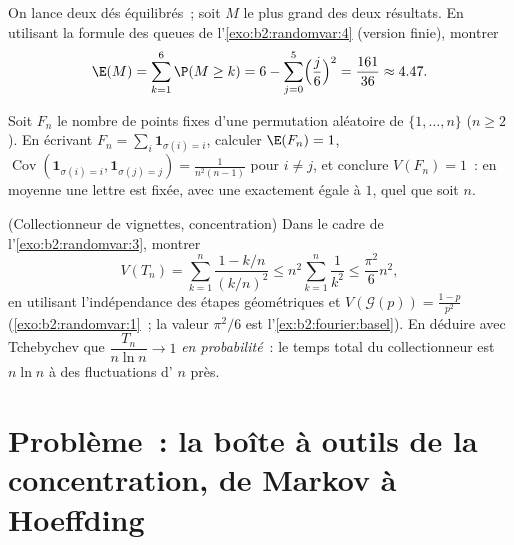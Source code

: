 \begin{exercise}[$\star$]\label{exo:b2:randomvar:10}
On lance deux dés équilibrés~; soit $M$ le plus grand des deux
résultats. En utilisant la formule des queues de l'\cref{exo:b2:randomvar:4}
(version finie), montrer
\[
\E(M) = \sum_{k=1}^{6}\P(M \geq k)
= 6 - \sum_{j=0}^5\Bigl(\frac j6\Bigr)^2 = \frac{161}{36}
\approx 4.47 .
\]
\end{exercise}

\begin{exercise}[$\star\star$]\label{exo:b2:randomvar:11}
Soit $F_n$ le nombre de points fixes d'une permutation 
aléatoire de $\{1, \dots, n\}$ ($n \geq 2$). En écrivant $F_n =
\sum_i\mathbf 1_{\sigma(i) = i}$, calculer $\E(F_n) = 1$,
$\operatorname{Cov}(\mathbf 1_{\sigma(i)=i}, \mathbf
1_{\sigma(j)=j}) = \frac1{n^2(n-1)}$ pour $i \neq j$, et
conclure $V(F_n) = 1$~: en moyenne une lettre est fixée, avec une
 exactement égale à $1$, quel que soit $n$.
\end{exercise}

\begin{exercise}[$\star\star\star$]\label{exo:b2:randomvar:12}
(Collectionneur de vignettes, concentration) Dans le cadre de
l'\cref{exo:b2:randomvar:3}, montrer
\[
V(T_n) = \sum_{k=1}^n\frac{1 - k/n}{(k/n)^2}
\leq n^2\sum_{k=1}^n\frac{1}{k^2} \leq \frac{\pi^2}{6}n^2,
\]
en utilisant l'indépendance des étapes géométriques et $V(\mathcal
G(p)) = \frac{1-p}{p^2}$ (\cref{exo:b2:randomvar:1}~; la valeur
$\pi^2/6$ est l'\cref{ex:b2:fourier:basel}). En déduire avec
Tchebychev que $\dfrac{T_n}{n\ln n} \to 1$ \emph{en
probabilité}~: le temps total du collectionneur est $n\ln n$ à des
fluctuations d' $n$ près.
\end{exercise}

\section{Problème~: la boîte à outils de la concentration, de Markov à
Hoeffding}

